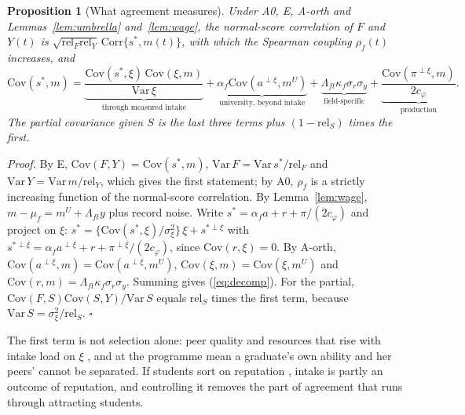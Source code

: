 \documentclass[11pt]{article}
\newtheorem{sprop}{Proposition}
\newcommand{\qedsq}{\hfill$\square$}
\begin{document}
\begin{sprop}[What agreement measures]\label{prop:agree}
Under A0, E, A-orth and Lemmas~\ref{lem:umbrella} and~\ref{lem:wage}, the normal-score correlation of $F$ and
$Y(t)$ is $\sqrt{\mathrm{rel}_F\mathrm{rel}_Y}\,\mathrm{Corr}\{s^*,m(t)\}$, with which the Spearman coupling
$\rho_f(t)$ increases, and
\begin{equation}\label{eq:decomp}
\mathrm{Cov}(s^*,m)=\underbrace{\frac{\mathrm{Cov}(s^*,\xi)\,\mathrm{Cov}(\xi,m)}{\mathrm{Var}\,\xi}}_{\text{through measured intake}}
+\underbrace{\alpha_f\mathrm{Cov}(a^{\perp\xi},m^U)}_{\text{university, beyond intake}}
+\underbrace{\Lambda_{ft}\kappa_f\sigma_r\sigma_y}_{\text{field-specific}}
+\underbrace{\frac{\mathrm{Cov}(\pi^{\perp\xi},m)}{2c_\varphi}}_{\text{production}}.
\end{equation}
The partial covariance given $S$ is the last three terms plus $(1-\mathrm{rel}_S)$ times the first.
\end{sprop}

\emph{Proof.} By E, $\mathrm{Cov}(F,Y)=\mathrm{Cov}(s^*,m)$, $\mathrm{Var}\,F=\mathrm{Var}\,s^*/\mathrm{rel}_F$ and
$\mathrm{Var}\,Y=\mathrm{Var}\,m/\mathrm{rel}_Y$, which gives the first statement; by A0, $\rho_f$ is a strictly
increasing function of the normal-score correlation. By Lemma~\ref{lem:wage}, $m-\mu_f=m^U+\Lambda_{ft}y$ plus
record noise. Write $s^*=\alpha_fa+r+\pi/(2c_\varphi)$ and project on $\xi$:
$s^*=\{\mathrm{Cov}(s^*,\xi)/\sigma_\xi^2\}\,\xi+s^{*\perp\xi}$ with
$s^{*\perp\xi}=\alpha_fa^{\perp\xi}+r+\pi^{\perp\xi}/(2c_\varphi)$, since $\mathrm{Cov}(r,\xi)=0$. By A-orth,
$\mathrm{Cov}(a^{\perp\xi},m)=\mathrm{Cov}(a^{\perp\xi},m^U)$, $\mathrm{Cov}(\xi,m)=\mathrm{Cov}(\xi,m^U)$ and
$\mathrm{Cov}(r,m)=\Lambda_{ft}\kappa_f\sigma_r\sigma_y$. Summing gives (\ref{eq:decomp}). For the partial,
$\mathrm{Cov}(F,S)\mathrm{Cov}(S,Y)/\mathrm{Var}\,S$ equals $\mathrm{rel}_S$ times the first term, because
$\mathrm{Var}\,S=\sigma_\xi^2/\mathrm{rel}_S$. \qedsq

The first term is not selection alone: peer quality and resources that rise with intake load on $\xi$
\citep{dale2002estimating}, and at the programme mean a graduate's own ability and her peers' cannot be separated.
If students sort on reputation \citep{macleod2015reputation}, intake is partly an outcome of reputation, and
controlling it removes the part of agreement that runs through attracting students.
\end{document}
